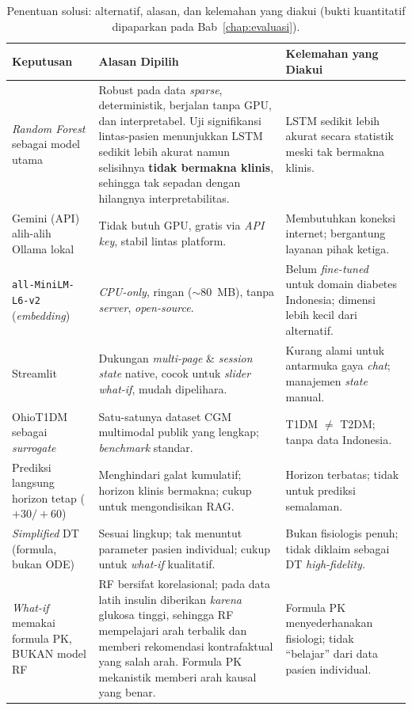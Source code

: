 \begin{table}[htbp]
\centering
\caption{Penentuan solusi: alternatif, alasan, dan kelemahan yang diakui (bukti kuantitatif dipaparkan pada Bab~\ref{chap:evaluasi}).}
\label{tab:penentuan-solusi}
\small
\begin{tabular}{@{}p{2.7cm}p{6.4cm}p{4cm}@{}}
\toprule
\textbf{Keputusan} & \textbf{Alasan Dipilih} & \textbf{Kelemahan yang Diakui} \\
\midrule
\emph{Random Forest} sebagai model utama & Robust pada data \emph{sparse}, deterministik, berjalan tanpa GPU, dan interpretabel. Uji signifikansi lintas-pasien menunjukkan LSTM sedikit lebih akurat namun selisihnya \textbf{tidak bermakna klinis}, sehingga tak sepadan dengan hilangnya interpretabilitas. & LSTM sedikit lebih akurat secara statistik meski tak bermakna klinis. \\[2pt]
Gemini (API) alih-alih Ollama lokal & Tidak butuh GPU, gratis via \emph{API key}, stabil lintas platform. & Membutuhkan koneksi internet; bergantung layanan pihak ketiga. \\[2pt]
\texttt{all-MiniLM-L6-v2} (\emph{embedding}) & \emph{CPU-only}, ringan ($\sim$80~MB), tanpa \emph{server}, \emph{open-source}. & Belum \emph{fine-tuned} untuk domain diabetes Indonesia; dimensi lebih kecil dari alternatif. \\[2pt]
Streamlit & Dukungan \emph{multi-page} \& \emph{session state} native, cocok untuk \emph{slider what-if}, mudah dipelihara. & Kurang alami untuk antarmuka gaya \emph{chat}; manajemen \emph{state} manual. \\[2pt]
OhioT1DM sebagai \emph{surrogate} & Satu-satunya dataset CGM multimodal publik yang lengkap; \emph{benchmark} standar. & T1DM $\neq$ T2DM; tanpa data Indonesia. \\[2pt]
Prediksi langsung horizon tetap ($+30/+60$) & Menghindari galat kumulatif; horizon klinis bermakna; cukup untuk mengondisikan RAG. & Horizon terbatas; tidak untuk prediksi semalaman. \\[2pt]
\emph{Simplified} DT (formula, bukan ODE) & Sesuai lingkup; tak menuntut parameter pasien individual; cukup untuk \emph{what-if} kualitatif. & Bukan fisiologis penuh; tidak diklaim sebagai DT \emph{high-fidelity}. \\[2pt]
\emph{What-if} memakai formula PK, BUKAN model RF & RF bersifat korelasional; pada data latih insulin diberikan \emph{karena} glukosa tinggi, sehingga RF mempelajari arah terbalik dan memberi rekomendasi kontrafaktual yang salah arah. Formula PK mekanistik memberi arah kausal yang benar. & Formula PK menyederhanakan fisiologi; tidak ``belajar'' dari data pasien individual. \\
\bottomrule
\end{tabular}
\end{table}
